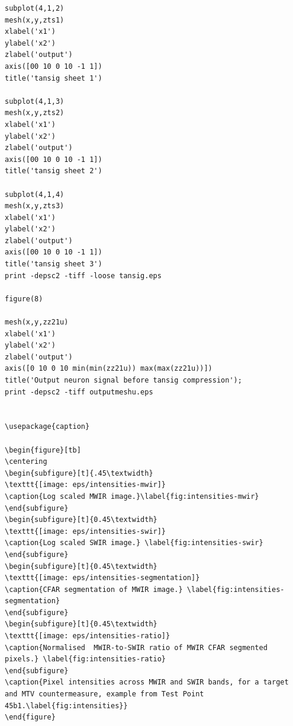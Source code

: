 \begin{lstlisting}
subplot(4,1,2)
mesh(x,y,zts1)
xlabel('x1')
ylabel('x2')
zlabel('output')
axis([00 10 0 10 -1 1])
title('tansig sheet 1')

subplot(4,1,3)
mesh(x,y,zts2)
xlabel('x1')
ylabel('x2')
zlabel('output')
axis([00 10 0 10 -1 1])
title('tansig sheet 2')

subplot(4,1,4)
mesh(x,y,zts3)
xlabel('x1')
ylabel('x2')
zlabel('output')
axis([00 10 0 10 -1 1])
title('tansig sheet 3')
print -depsc2 -tiff -loose tansig.eps

figure(8)

mesh(x,y,zz21u)
xlabel('x1')
ylabel('x2')
zlabel('output')
axis([0 10 0 10 min(min(zz21u)) max(max(zz21u))])
title('Output neuron signal before tansig compression');
print -depsc2 -tiff outputmeshu.eps


\usepackage{caption}

\begin{figure}[tb]
\centering
\begin{subfigure}[t]{.45\textwidth}
\texttt{[image: eps/intensities-mwir]}
\caption{Log scaled MWIR image.}\label{fig:intensities-mwir}
\end{subfigure}
\begin{subfigure}[t]{0.45\textwidth}
\texttt{[image: eps/intensities-swir]}
\caption{Log scaled SWIR image.} \label{fig:intensities-swir}
\end{subfigure}
\begin{subfigure}[t]{0.45\textwidth}
\texttt{[image: eps/intensities-segmentation]}
\caption{CFAR segmentation of MWIR image.} \label{fig:intensities-segmentation}
\end{subfigure}
\begin{subfigure}[t]{0.45\textwidth}
\texttt{[image: eps/intensities-ratio]}
\caption{Normalised  MWIR-to-SWIR ratio of MWIR CFAR segmented pixels.} \label{fig:intensities-ratio}
\end{subfigure}
\caption{Pixel intensities across MWIR and SWIR bands, for a target and MTV countermeasure, example from Test Point 45b1.\label{fig:intensities}}
\end{figure}



\end{lstlisting}